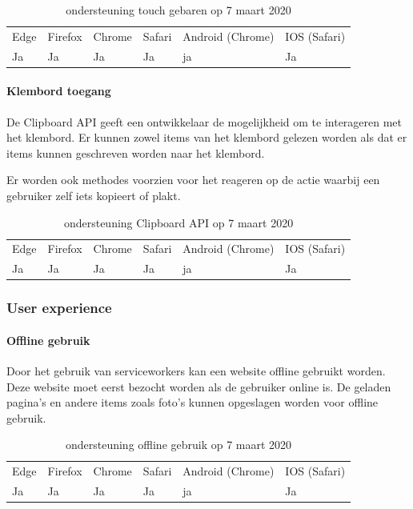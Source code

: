 \begin{table}[H]
	\centering
	\begin{tabular}{llllll}
		Edge & Firefox & Chrome & Safari & Android (Chrome) & IOS (Safari) \\
		Ja   & Ja      &  Ja     & Ja     & ja               & Ja          
	\end{tabular}	
	\caption{ondersteuning touch gebaren op 7 maart 2020}
\end{table}	

\paragraph{Klembord toegang}
De Clipboard API \autocite{Kacmarcik2019} geeft een ontwikkelaar de mogelijkheid om te interageren met het klembord. Er kunnen zowel items van het klembord gelezen worden als dat er items kunnen geschreven worden naar het klembord.

Er worden ook methodes voorzien voor het reageren op de actie waarbij een gebruiker zelf iets kopieert of plakt. 

\begin{table}[H]
	\centering
	\begin{tabular}{llllll}
		Edge & Firefox & Chrome & Safari & Android (Chrome) & IOS (Safari) \\
		Ja   & Ja      &  Ja     & Ja     & ja               & Ja          
	\end{tabular}	
	\caption{ondersteuning Clipboard API op 7 maart 2020}
\end{table}	


\subsubsection{User experience}

\paragraph{Offline gebruik}
Door het gebruik van serviceworkers kan een website offline gebruikt worden. Deze website moet eerst bezocht worden als de gebruiker online is. De geladen pagina's en andere items zoals foto’s kunnen opgeslagen worden voor offline gebruik.

\begin{table}[H]
	\begin{tabular}{llllll}
		Edge & Firefox & Chrome & Safari & Android (Chrome) & IOS (Safari) \\
		Ja   & Ja      &  Ja     & Ja     & ja               & Ja          
	\end{tabular}	
	\caption{ondersteuning offline gebruik op 7 maart 2020}
\end{table}	



